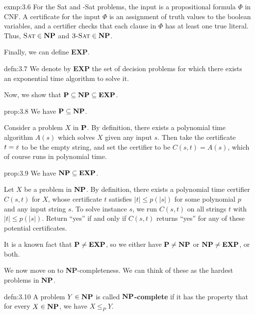 \begin{exmp}{exmp:3.6}
    For the {\sc Sat} and {-Sat} problems, the input is a propositional 
    formula $\Phi$ in CNF. A certificate for the input $\Phi$ is an 
    assignment of truth values to the boolean variables, and a certifier 
    checks that each clause in $\Phi$ has at least one true literal. 
    Thus, $\textsc{Sat} \in {\bf NP}$ and $\textsc{3-Sat} \in {\bf NP}$. 
\end{exmp}

Finally, we can define {\bf EXP}. 

\begin{defn}{defn:3.7}
    We denote by {\bf EXP} the set of decision problems for which there 
    exists an exponential time algorithm to solve it.
\end{defn}

\newpage
Now, we show that $\operatorname{\textbf{P}} \subseteq \operatorname{\textbf{NP}} \subseteq \operatorname{\textbf{EXP}}$. 

\begin{prop}{prop:3.8}
    We have $\operatorname{\textbf{P}} \subseteq \operatorname{\textbf{NP}}$. 
\end{prop}
\begin{pf}
    Consider a problem $X$ in $\operatorname{\textbf{P}}$. By definition, there exists a 
    polynomial time algorithm $A(s)$ which solves $X$ given any input $s$. 
    Then take the certificate $t = \varepsilon$ to be the empty string, and 
    set the certifier to be $C(s, t) = A(s)$, which of course runs 
    in polynomial time. 
\end{pf}

\begin{prop}{prop:3.9}
    We have $\operatorname{\textbf{NP}} \subseteq \operatorname{\textbf{EXP}}$. 
\end{prop}
\begin{pf}
    Let $X$ be a problem in $\operatorname{\textbf{NP}}$. By definition, there exists a polynomial 
    time certifier $C(s, t)$ for $X$, whose certificate $t$ satisfies 
    $|t| \leq p(|s|)$ for some polynomial $p$ and any input string $s$. 
    To solve instance $s$, we run $C(s, t)$ on all strings $t$ with 
    $|t| \leq p(|s|)$. Return ``yes'' if and only if $C(s, t)$ returns 
    ``yes'' for any of these potential certificates. 
\end{pf}

It is a known fact that $\operatorname{\textbf{P}} \neq \operatorname{\textbf{EXP}}$, so we either have $\operatorname{\textbf{P}} \neq \operatorname{\textbf{NP}}$ 
or $\operatorname{\textbf{NP}} \neq \operatorname{\textbf{EXP}}$, or both. 

We now move on to {\bf NP}-completeness. We can think of these as the 
hardest problems in $\operatorname{\textbf{NP}}$. 

\begin{defn}{defn:3.10}
    A problem $Y \in \operatorname{\textbf{NP}}$ is called {\bf $\operatorname{\textbf{NP}}$-complete} if it has the property 
    that for every $X \in \operatorname{\textbf{NP}}$, we have $X \leq_P Y$. 
\end{defn}

